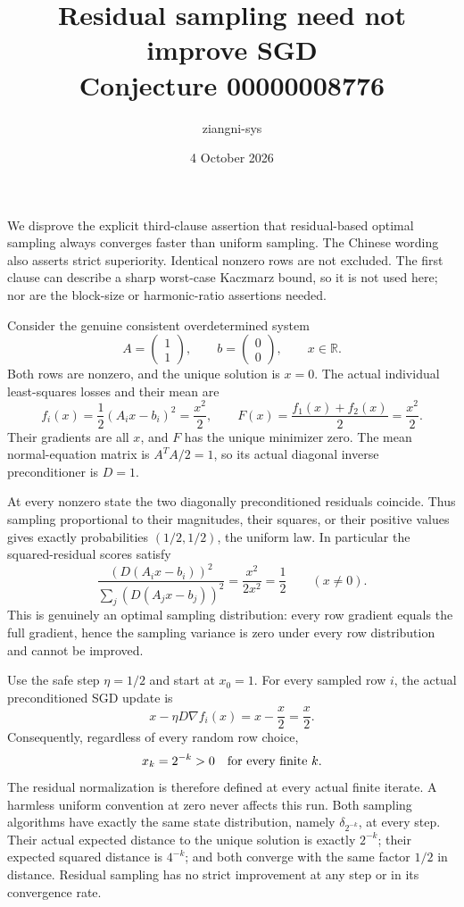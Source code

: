 \documentclass[11pt]{article}
\title{Residual sampling need not improve SGD\\Conjecture 00000008776}
\author{ziangni-sys}
\date{4 October 2026}
\begin{document}
\maketitle
We disprove the explicit third-clause assertion that residual-based optimal sampling always converges faster than uniform sampling. The Chinese wording also asserts strict superiority. Identical nonzero rows are not excluded. The first clause can describe a sharp worst-case Kaczmarz bound, so it is not used here; nor are the block-size or harmonic-ratio assertions needed.

Consider the genuine consistent overdetermined system
\[
A=\begin{pmatrix}1\\1\end{pmatrix},\qquad b=\begin{pmatrix}0\\0\end{pmatrix},
\qquad x\in\mathbb R.
\]
Both rows are nonzero, and the unique solution is $x=0$. The actual individual least-squares losses and their mean are
\[
f_i(x)=\frac12(A_i x-b_i)^2=\frac{x^2}{2},\qquad
F(x)=\frac{f_1(x)+f_2(x)}2=\frac{x^2}{2}.
\]
Their gradients are all $x$, and $F$ has the unique minimizer zero. The mean normal-equation matrix is $A^TA/2=1$, so its actual diagonal inverse preconditioner is $D=1$.

At every nonzero state the two diagonally preconditioned residuals coincide. Thus sampling proportional to their magnitudes, their squares, or their positive values gives exactly probabilities $(1/2,1/2)$, the uniform law. In particular the squared-residual scores satisfy
\[
\frac{(D(A_i x-b_i))^2}{\sum_j(D(A_j x-b_j))^2}
=\frac{x^2}{2x^2}=\frac12\qquad(x\ne0).
\]
This is genuinely an optimal sampling distribution: every row gradient equals the full gradient, hence the sampling variance is zero under every row distribution and cannot be improved.

Use the safe step $\eta=1/2$ and start at $x_0=1$. For every sampled row $i$, the actual preconditioned SGD update is
\[
x-\eta D\nabla f_i(x)=x-\frac{x}{2}=\frac{x}{2}.
\]
Consequently, regardless of every random row choice,
\[
x_k=2^{-k}>0\quad\hbox{for every finite }k.
\]
The residual normalization is therefore defined at every actual finite iterate. A harmless uniform convention at zero never affects this run. Both sampling algorithms have exactly the same state distribution, namely $\delta_{2^{-k}}$, at every step. Their actual expected distance to the unique solution is exactly $2^{-k}$; their expected squared distance is $4^{-k}$; and both converge with the same factor $1/2$ in distance. Residual sampling has no strict improvement at any step or in its convergence rate.
\end{document}
